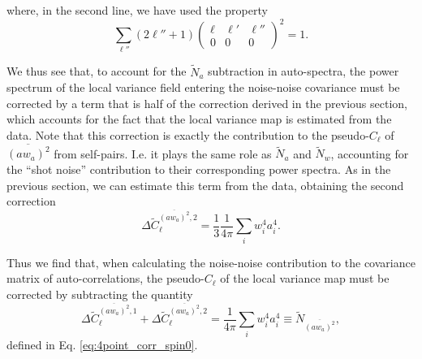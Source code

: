 \documentclass[aps,twocolumn, superscriptaddress, english, nofootinbib, 10pt]{revtex4-2}
\newcommand{\wtj}[6]{\left(\begin{array}{ccc} #1 & #2 & #3\\#4 & #5 & #6\end{array} \right)}
\begin{document}
    where, in the second line, we have used the property
    \begin{equation}
      \sum_{\ell''}(2\ell''+1)\wtj{\ell}{\ell'}{\ell''}{0}{0}{0}^2=1.
    \end{equation}

    We thus see that, to account for the $\tilde{N}_a$ subtraction in auto-spectra, the power spectrum of the local variance field entering the noise-noise covariance must be corrected by a term that is half of the correction derived in the previous section, which accounts for the fact that the local variance map is estimated from the data. Note that this correction is exactly the contribution to the pseudo-$C_\ell$ of $\overline{(aw_a)^2}$ from self-pairs. I.e. it plays the same role as $\tilde{N}_a$ and $\tilde{N}_w$, accounting for the ``shot noise'' contribution to their corresponding power spectra. As in the previous section, we can estimate this term from the data, obtaining the second correction
    \begin{equation}
      \Delta\tilde{C}^{\overline{(aw_a)^2},2}_\ell=\frac{1}{3}\frac{1}{4\pi}\sum_iw_i^4a_i^4.
    \end{equation}

    Thus we find that, when calculating the noise-noise contribution to the covariance matrix of auto-correlations, the pseudo-$C_\ell$ of the local variance map must be corrected by subtracting the quantity
    \begin{equation}
      \Delta\tilde{C}^{\overline{(aw_a)^2},1}_\ell+\Delta\tilde{C}^{\overline{(aw_a)^2},2}_\ell=\frac{1}{4\pi}\sum_iw_i^4a_i^4\equiv\tilde{N}_{\overline{(aw_a)^2}},
    \end{equation}
    defined in Eq. \ref{eq:4point_corr_spin0}.

\end{document}
